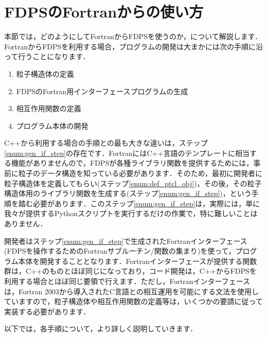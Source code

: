 \documentclass[twocolumn,10pt]{jarticle}
\begin{document}
\section{FDPSのFortranからの使い方}\label{sec:usage_of_fdps_from_ftn}
本節では，どのようにしてFortranからFDPSを使うのか，について解説します．FortranからFDPSを利用する場合，プログラムの開発は大まかには次の手順に沿って行うことになります．
\begin{enumerate}
\item 粒子構造体の定義 \label{enum:def_ptcl_obj}
\item FDPSのFortran用インターフェースプログラムの生成 \label{enum:gen_if_step}
\item 相互作用関数の定義 \label{enum:def_interact_func}
\item プログラム本体の開発
\end{enumerate}
C++から利用する場合の手順との最も大きな違いは，ステップ\ref{enum:gen_if_step}の存在です．FortranにはC++言語のテンプレートに相当する機能がありませんので，FDPSが各種ライブラリ関数を提供するためには，事前に粒子のデータ構造を知っている必要があります．そのため，最初に開発者に粒子構造体を定義してもらい(ステップ\ref{enum:def_ptcl_obj})，その後，その粒子構造体用のライブラリ関数を生成する(ステップ\ref{enum:gen_if_step})，という手順を踏む必要があります．このステップ\ref{enum:gen_if_step}は，実際には，単に我々が提供するPythonスクリプトを実行するだけの作業で，特に難しいことはありません．

開発者はステップ\ref{enum:gen_if_step}で生成されたFortranインターフェース(FDPSを操作するためのFortranサブルーチン/関数の集まり)を使って，プログラム本体を開発することとなります．Fortranインターフェースが提供する関数群は，C++のものとほぼ同じになっており，コード開発は，C++からFDPSを利用する場合とほぼ同じ要領で行えます．ただし，Fortranインターフェースは，Fortran 2003から導入されたC言語との相互運用を可能にする文法を使用していますので，粒子構造体や相互作用関数の定義等は，いくつかの要請に従って実装する必要があります．

以下では，各手順について，より詳しく説明していきます．
\end{document}
